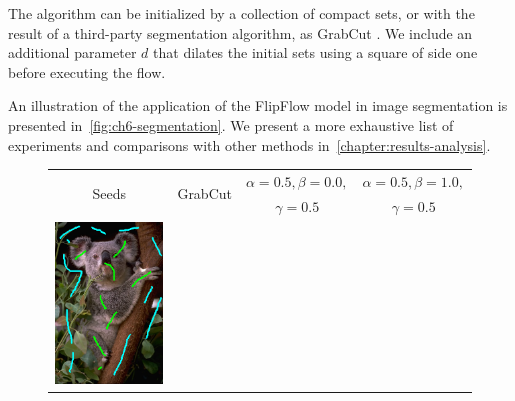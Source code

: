 The algorithm can be initialized by a collection of compact sets, or with the result of a third-party segmentation algorithm, as GrabCut \cite{rother04grabcut}. We include an additional parameter $d$ that dilates the initial sets using a square of side one before executing the flow.

An illustration of the application of the FlipFlow model in image segmentation is presented in~\cref{fig:ch6-segmentation}. We present a more exhaustive list of experiments and comparisons with other methods in~\cref{chapter:results-analysis}.
	
\begin{figure}
\center
\begin{tabular}{cccc}
\multirow{2}{*}{Seeds} & \multirow{2}{*}{GrabCut} & $\alpha=0.5, \beta=0.0,$ & $\alpha=0.5, \beta=1.0,$ \\
& & $\gamma=0.5$ & $\gamma=0.5$\\
 	\includegraphics[scale=0.25]{figures/chapter6/segmentation/coala/mt_improve/radius_5/data_0.50/sq_0.00/length_0.50/it_50/seeds.png} & 

\end{tabular}
\end{figure}
